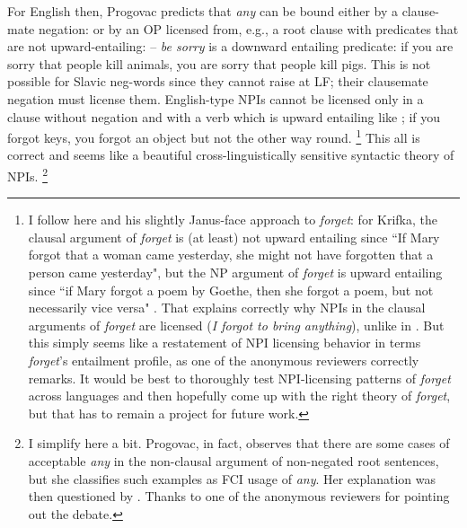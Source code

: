 \documentclass[output=paper,colorlinks,citecolor=brown]{langscibook}
\begin{document}
For English then, Progovac predicts that \emph{any} can be bound either by a clause-mate negation:  or by an OP licensed from, e.g., a root clause with predicates that are not upward-entailing:  -- \emph{be sorry} is a downward entailing predicate: if you are sorry that people kill animals, you are sorry that people kill pigs. This is not possible for Slavic neg-words since they cannot raise at LF; their clausemate negation must license them. English-type NPIs cannot be licensed only in a clause without negation and with a verb which is upward entailing like ; if you forgot keys, you forgot an object but not the other way round.%
\footnote{I follow here \citet{krifka1995semantics} and his slightly Janus-face approach to \textit{forget}: for Krifka, the clausal argument of \textit{forget} is (at least) not upward entailing since ``If Mary forgot that a woman came yesterday, she might not have forgotten that a person came yesterday", but the NP argument of \textit{forget} is upward entailing since ``if Mary forgot a poem by Goethe, then she forgot a poem, but not necessarily vice versa" \citep[212]{krifka1995semantics}. That explains correctly why NPIs in the clausal arguments of \textit{forget} are licensed (\textit{I forgot to bring anything}), unlike in . But this simply seems like a restatement of NPI licensing behavior in terms \textit{forget}'s entailment profile, as one of the anonymous reviewers correctly remarks. It would be best to thoroughly test NPI-licensing patterns of \textit{forget} across languages and then hopefully come up with the right theory of \textit{forget}, but that has to remain a project for future work. }
This all is correct and seems like a beautiful cross-linguistically sensitive syntactic theory of NPIs.%
\footnote{I simplify here a bit. Progovac, in fact, observes that there are some cases of acceptable \textit{any} in the non-clausal argument of non-negated root sentences, but she classifies such examples as FCI usage of \textit{any}. Her explanation was then questioned by \citet{horn1995progovac,hoeksema1996progovac}. Thanks to one of the anonymous reviewers for pointing out the debate.}

\ea\label{ex:7}
\z\z
\end{document}
